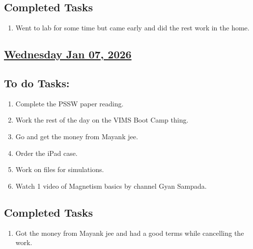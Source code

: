 \subsection*{Completed Tasks}
\begin{enumerate}[\ding{52}]  %
    \item Went to lab for some time but came early and did the rest work in the home. 
\end{enumerate}
\subsection*{\underline{Wednesday Jan 07, 2026} }
\subsection*{To do Tasks:}
\begin{enumerate}
    \item Complete the PSSW paper reading.\cmark
    \item Work the rest of the day on the VIMS Boot Camp thing. \xmark
    \item Go and get the money from Mayank jee.\cmark
    \item Order the iPad case.\cmark
    \item Work on files for simulations.\xmark
    \item Watch 1 video of Magnetism basics by channel Gyan Sampada. \xmark
\end{enumerate}
\subsection*{Completed Tasks}
\begin{enumerate}[\ding{52}]  %
    \item Got the money from Mayank jee and had a good terms while cancelling the work.
\end{enumerate}

